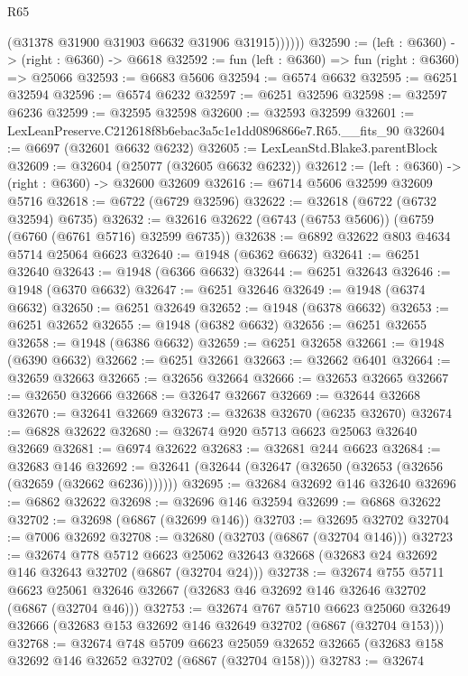 \begin{lexlean}{R65}
\begin{coremodule}
{              (@31378 @31900 @31903 @6632 @31906 @31915))))))
@32590 := (left : @6360) -> (right : @6360) -> @6618
@32592 := fun (left : @6360) => fun (right : @6360) => @25066
@32593 := @6683 @5606
@32594 := @6574 @6632
@32595 := @6251 @32594
@32596 := @6574 @6232
@32597 := @6251 @32596
@32598 := @32597 @6236
@32599 := @32595 @32598
@32600 := @32593 @32599
@32601 := LexLeanPreserve.C212618f8b6ebac3a5c1e1dd0896866e7.R65.__fits_90
@32604 := @6697 (@32601 @6632 @6232)
@32605 := LexLeanStd.Blake3.parentBlock
@32609 := @32604 (@25077 (@32605 @6632 @6232))
@32612 := (left : @6360) -> (right : @6360) -> @32600 @32609
@32616 := @6714 @5606 @32599 @32609 @5716
@32618 := @6722 (@6729 @32596)
@32622 := @32618 (@6722 (@6732 @32594) @6735)
@32632 := @32616 @32622 (@6743 (@6753 @5606)) (@6759 (@6760 (@6761 @5716) @32599 @6735))
@32638 := @6892 @32622 @803 @4634 @5714 @25064 @6623
@32640 := @1948 (@6362 @6632)
@32641 := @6251 @32640
@32643 := @1948 (@6366 @6632)
@32644 := @6251 @32643
@32646 := @1948 (@6370 @6632)
@32647 := @6251 @32646
@32649 := @1948 (@6374 @6632)
@32650 := @6251 @32649
@32652 := @1948 (@6378 @6632)
@32653 := @6251 @32652
@32655 := @1948 (@6382 @6632)
@32656 := @6251 @32655
@32658 := @1948 (@6386 @6632)
@32659 := @6251 @32658
@32661 := @1948 (@6390 @6632)
@32662 := @6251 @32661
@32663 := @32662 @6401
@32664 := @32659 @32663
@32665 := @32656 @32664
@32666 := @32653 @32665
@32667 := @32650 @32666
@32668 := @32647 @32667
@32669 := @32644 @32668
@32670 := @32641 @32669
@32673 := @32638 @32670 (@6235 @32670)
@32674 := @6828 @32622
@32680 := @32674 @920 @5713 @6623 @25063 @32640 @32669
@32681 := @6974 @32622
@32683 := @32681 @244 @6623
@32684 := @32683 @146
@32692 := @32641 (@32644 (@32647 (@32650 (@32653 (@32656 (@32659 (@32662 @6236)))))))
@32695 := @32684 @32692 @146 @32640
@32696 := @6862 @32622
@32698 := @32696 @146 @32594
@32699 := @6868 @32622
@32702 := @32698 (@6867 (@32699 @146))
@32703 := @32695 @32702
@32704 := @7006 @32692
@32708 := @32680 (@32703 (@6867 (@32704 @146)))
@32723 := @32674
    @778
    @5712
    @6623
    @25062
    @32643
    @32668
    (@32683 @24 @32692 @146 @32643 @32702 (@6867 (@32704 @24)))
@32738 := @32674
    @755
    @5711
    @6623
    @25061
    @32646
    @32667
    (@32683 @46 @32692 @146 @32646 @32702 (@6867 (@32704 @46)))
@32753 := @32674
    @767
    @5710
    @6623
    @25060
    @32649
    @32666
    (@32683 @153 @32692 @146 @32649 @32702 (@6867 (@32704 @153)))
@32768 := @32674
    @748
    @5709
    @6623
    @25059
    @32652
    @32665
    (@32683 @158 @32692 @146 @32652 @32702 (@6867 (@32704 @158)))
@32783 := @32674
}
\end{coremodule}
\end{lexlean}

